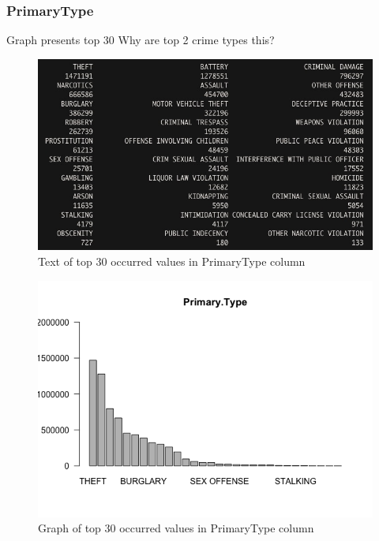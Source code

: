 \newpage
\subsubsection{PrimaryType}
Graph presents top 30
Why are top 2 crime types this?
\begin{figure}[H]
\includegraphics[scale=0.55]{images/EDA/PrimaryType.jpg}
\centering
\caption{Text of top 30 occurred values in PrimaryType column}
\end{figure}
\begin{figure}[H]
\includegraphics[scale=0.7]{images/EDA/PrimaryType.png}
\centering
\caption{Graph of top 30 occurred values in PrimaryType column}
\end{figure}